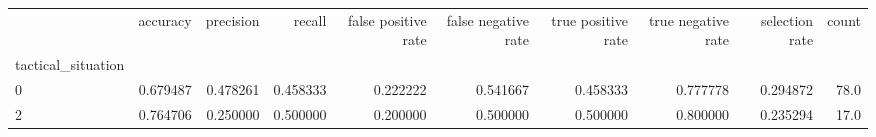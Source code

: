 \begin{tabular}{lrrrrrrrrr}
\toprule
{} &  accuracy &  precision &    recall &  false positive rate &  false negative rate &  true positive rate &  true negative rate &  selection rate &  count \\
tactical\_situation &           &            &           &                      &                      &                     &                     &                 &        \\
\midrule
0                  &  0.679487 &   0.478261 &  0.458333 &             0.222222 &             0.541667 &            0.458333 &            0.777778 &        0.294872 &   78.0 \\
2                  &  0.764706 &   0.250000 &  0.500000 &             0.200000 &             0.500000 &            0.500000 &            0.800000 &        0.235294 &   17.0 \\
\bottomrule
\end{tabular}

